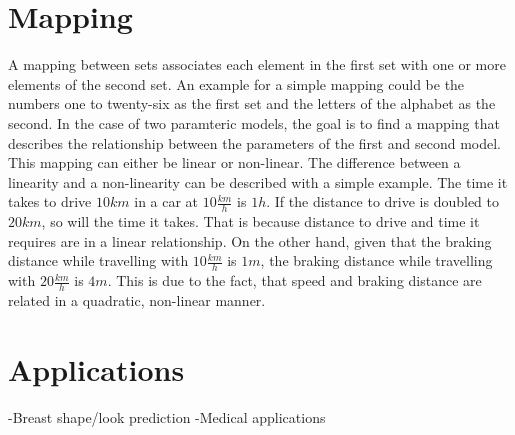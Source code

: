 \section{Mapping}
A mapping between sets associates each element in the first set with one or more elements of the second set. An example for a simple mapping could be the numbers one to twenty-six as the first set and the letters of the alphabet as the second. In the case of two paramteric models, the goal is to find a mapping that describes the relationship between the parameters of the first and second model. \\
This mapping can either be linear or non-linear. The difference between a linearity and a non-linearity can be described with a simple example. The time it takes to drive $10km$ in a car at $10\frac{km}{h}$ is $1h$. If the distance to drive is doubled to $20km$, so will the time it takes. That is because distance to drive and time it requires are in a linear relationship. On the other hand, given that the braking distance while travelling with $10\frac{km}{h}$ is $1m$, the braking distance while travelling with $20\frac{km}{h}$ is $4m$. This is due to the fact, that speed and braking distance are related in a quadratic, non-linear manner.

\section{Applications}
-Breast shape/look prediction
-Medical applications
